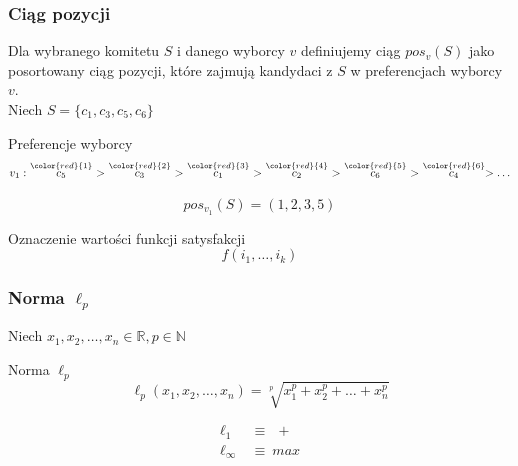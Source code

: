 \documentclass{beamer}
\newcommand{\red}[1]{
	{ \color{red}{#1} }
}
\newcommand{\score}[2]{
	\stackrel
	{\red{#1}}
	{#2}
}
\begin{document}

\begin{frame}
\frametitle{Ciąg pozycji}

Dla wybranego komitetu $S$ i danego
wyborcy $v$ definiujemy ciąg $pos_v(S) $ jako
posortowany ciąg pozycji, które zajmują kandydaci z $S$ w preferencjach wyborcy $v$. \\ 
\vspace{\baselineskip}
Niech $S = \{c_1, c_3, c_5, c_6\}$

\begin{exampleblock}{Preferencje wyborcy}
$$
v_1: \ \score{1}{c_5} \ > \ \score{2}{c_3} \ > \ \score{3}{c_1} \ > \ \score{4}{c_2} \ > \ \score{5}{c_6} \ > \ \score{6}{c_4} > \ldots
$$
\end{exampleblock}

$$pos_{v_1}(S) = (1, 2, 3, 5)$$

\begin{exampleblock}{Oznaczenie wartości funkcji satysfakcji}
$$
f(i_1, \ldots, i_k)
$$
\end{exampleblock}

\end{frame}







\begin{frame}
\frametitle{Norma $\ell_p$}
Niech $x_1, x_2, \ldots , x_n \in \mathbb{R}, p \in \mathbb{N}$
\begin{block}{Norma $\ell_p$}
$$
\ell_p(x_1, x_2, \ldots, x_n ) = \sqrt[p]{ x_1^p + x_2^p + \ldots + x_n^p }
$$
\end{block}

\begin{exampleblock}{}
$$
\begin{aligned}
\ell_1 	\	 &\equiv 	\ \ +  \\
\ell_\infty 	\  &\equiv 	\ max 
\end{aligned}
$$
\end{exampleblock}

\end{frame}
\end{document}
